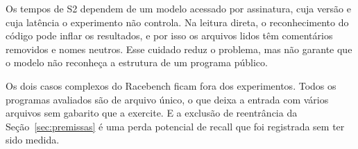 Os tempos de S2 dependem de um modelo acessado por assinatura, cuja versão e
cuja latência o experimento não controla. Na leitura direta, o reconhecimento
do código pode inflar os resultados, e por isso os arquivos lidos têm
comentários removidos e nomes neutros. Esse cuidado reduz o problema, mas não
garante que o modelo não reconheça a estrutura de um programa público.

Os dois casos complexos do Racebench ficam fora dos experimentos.
 Todos os
programas avaliados são de arquivo único, o que deixa a entrada com vários
arquivos sem gabarito que a exercite. E a exclusão de reentrância da
Seção~\ref{sec:premissas} é uma perda potencial de recall que foi registrada
sem ter sido medida.
